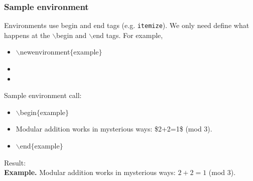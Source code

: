 \begin{frame}  \frametitle{Sample environment}
	Environments use begin and end tags (e.g. \texttt{itemize}). We only need define what happens at the {\color{command}$\backslash$begin} and {\color{command}$\backslash$end} tags. For example,
	\begin{itemize}
		\item[] {\color{command}$\backslash$newenvironment\color{braces}$\{${\color{black}example}$\}$}
		\item[] 
		\item[] 
	\end{itemize}
	Sample environment call:
	\begin{itemize}
		\item[] {\color{command}$\backslash$begin\color{braces}$\{${\color{black}example}$\}$}
		\item[] Modular addition works in mysterious ways: {\color{braces}\$}2+2=1{\color{braces}\$} (mod 3).
		\item[] {\color{command}$\backslash$end\color{braces}$\{${\color{black}example}$\}$}
	\end{itemize}
	Result:
	\vspace{5mm} \\
	\small\textbf{Example.}\hspace{1.5mm} Modular addition works in mysterious ways: $2+2 = 1$ (mod 3).
\end{frame}

